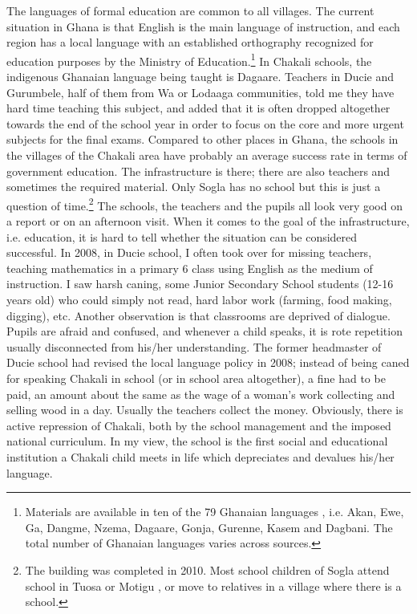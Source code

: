The languages of formal education are common to all villages. The current
situation in Ghana is that English is the main language of instruction, and each
region has a local language with
an established orthography recognized for education purposes by the Ministry of
Education.\footnote{Materials are available in
ten of the 79 Ghanaian languages \citep{Lewi09}, i.e. Akan, Ewe, Ga, Dangme,
Nzema, Dagaare, Gonja, Gurenne, Kasem and Dagbani. The total number of Ghanaian
languages varies across sources. } In Chakali schools, the 
indigenous Ghanaian language being taught is Dagaare. Teachers in Ducie and
Gurumbele, half of them from Wa or Lodaaga communities,  told me they have hard
time teaching this subject, and added that it is often dropped altogether
towards the end of the school year in order to focus on the core and more urgent
subjects for the final exams. Compared to other places in Ghana, the schools in
the villages of the Chakali area have probably an average success rate in terms
of government education. The infrastructure is there; there are also teachers
and
sometimes the required material. Only Sogla has no school but this is just a
question of time.\footnote{The building was completed in 2010.  Most
school children of Sogla attend school in Tuosa or Motigu , or move to 
relatives in a
village where there is a school.}  The schools, the teachers and the pupils all
look very good
on a report or on an afternoon visit. When it comes to the goal of the
infrastructure, i.e.  education, it is hard to tell whether the situation can be
considered successful. In 2008, in Ducie school,  I often took over for
missing teachers, teaching mathematics in  a primary 6 class using English as
the
medium of instruction.  I saw harsh caning, some Junior Secondary School
students (12-16 years old) who could simply not read, hard labor work (farming,
food making, digging), etc. Another observation is that classrooms are deprived
 of dialogue. Pupils are afraid and confused, and whenever a child speaks, it
is rote repetition usually disconnected from his/her understanding. The former
headmaster of Ducie school had revised the local language policy  in 2008;
instead of being caned for speaking Chakali in school (or in school area
altogether), a fine had to be paid, an amount about the same as the wage of a
woman's work collecting and selling wood in a day. Usually the teachers
 collect the money. Obviously,  there is  active repression of
Chakali, both by the school management and the imposed national curriculum. In
my  view,  the school is the first social and educational institution a Chakali
child meets in life  which depreciates and devalues his/her language.


